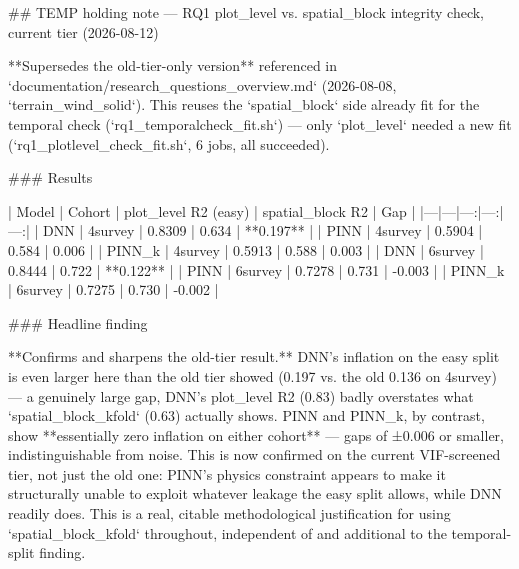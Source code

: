## TEMP holding note — RQ1 plot_level vs. spatial_block integrity check, current tier (2026-08-12)

**Supersedes the old-tier-only version** referenced in `documentation/research_questions_overview.md`
(2026-08-08, `terrain_wind_solid`). This reuses the `spatial_block` side already fit for the
temporal check (`rq1_temporalcheck_fit.sh`) — only `plot_level` needed a new fit
(`rq1_plotlevel_check_fit.sh`, 6 jobs, all succeeded).

### Results

| Model | Cohort | plot_level R2 (easy) | spatial_block R2 | Gap |
|---|---|---:|---:|---:|
| DNN | 4survey | 0.8309 | 0.634 | **0.197** |
| PINN | 4survey | 0.5904 | 0.584 | 0.006 |
| PINN_k | 4survey | 0.5913 | 0.588 | 0.003 |
| DNN | 6survey | 0.8444 | 0.722 | **0.122** |
| PINN | 6survey | 0.7278 | 0.731 | -0.003 |
| PINN_k | 6survey | 0.7275 | 0.730 | -0.002 |

### Headline finding

**Confirms and sharpens the old-tier result.** DNN's inflation on the easy split is even larger
here than the old tier showed (0.197 vs. the old 0.136 on 4survey) — a genuinely large gap, DNN's
plot_level R2 (0.83) badly overstates what `spatial_block_kfold` (0.63) actually shows. PINN and
PINN_k, by contrast, show **essentially zero inflation on either cohort** — gaps of ±0.006 or
smaller, indistinguishable from noise. This is now confirmed on the current VIF-screened tier,
not just the old one: PINN's physics constraint appears to make it structurally unable to exploit
whatever leakage the easy split allows, while DNN readily does. This is a real, citable
methodological justification for using `spatial_block_kfold` throughout, independent of and
additional to the temporal-split finding.
